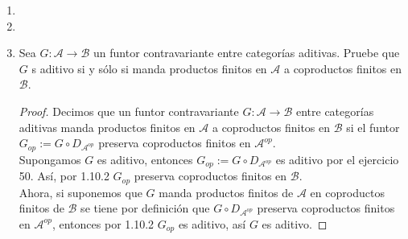 \documentclass{article}
\begin{document}
\begin{enumerate}[label=\textbf{Ej \arabic*.}]
\item
\item

\item Sea $G:\mathscr{A}\longrightarrow \mathscr{B}$ un funtor contravariante entre categorías aditivas. Pruebe que $G$ s aditivo si y sólo si
manda productos finitos en $\mathscr{A}$ a coproductos finitos en $\mathscr{B}$.

\begin{proof}
Decimos que un funtor contravariante $G:\mathscr{A}\longrightarrow \mathscr{B}$ entre categorías aditivas manda productos finitos en $\mathscr{A}$ 
a coproductos finitos en $\mathscr{B}$ si el funtor $G_{op}:=G\circ D_{\mathscr{A}^{op}}$ preserva coproductos finitos en $\mathscr{A}^{op}$.\\

Supongamos $G$ es aditivo, entonces $G_{op}:=G\circ D_{\mathscr{A}^{op}}$ es aditivo por el ejercicio 50. Así, por 1.10.2 $G_{op}$ preserva
coproductos finitos en $\mathscr{B}$.\\

Ahora, si suponemos que $G$ manda productos finitos de $\mathscr{A}$ en coproductos finitos de $\mathscr{B}$ se tiene por definición que
$G\circ D_{\mathscr{A}^{op}}$ preserva coproductos finitos en ${\mathscr{A}^{op}}$, entonces por 1.10.2 $G_{op}$ es aditivo, así
$G$ es aditivo.

\end{proof}



















\end{enumerate}
\end{document}
